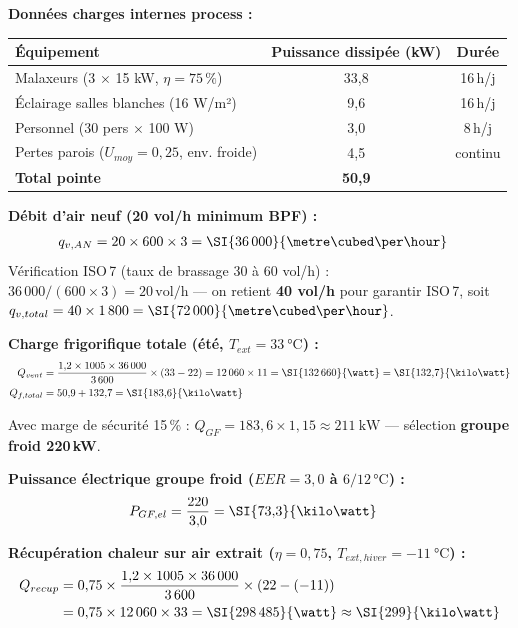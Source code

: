 \begin{exemple}[title={Salle ISO 7 — Pharma à Strasbourg — Bilan complet}]
\textbf{Données charges internes process :}

\begin{center}
\begin{tabular}{lcc}
  \toprule
  Équipement & Puissance dissipée (\si{\kilo\watt}) & Durée \\
  \midrule
  Malaxeurs (3 $\times$ 15 kW, $\eta = 75\,\%$) & 33,8 & 16\,h/j \\
  Éclairage salles blanches (16 W/m²)           &  9,6 & 16\,h/j \\
  Personnel (30 pers $\times$ 100 W)            &  3,0 &  8\,h/j \\
  Pertes parois ($U_{moy} = 0{,}25$, env. froide)&  4,5 & continu \\
  \midrule
  \textbf{Total pointe} & \textbf{50,9} & \\
  \bottomrule
\end{tabular}
\end{center}

\textbf{Débit d'air neuf (20 vol/h minimum BPF) :}
\begin{align*}
  q_{v,AN} &= 20 \times 600 \times 3 = \SI{36\,000}{\metre\cubed\per\hour}
\end{align*}
Vérification ISO\,7 (taux de brassage 30 à 60 vol/h) : $36\,000 / (600 \times 3) = 20\,\mathrm{vol/h}$ —
on retient \textbf{40 vol/h} pour garantir ISO\,7, soit
$q_{v,total} = 40 \times 1\,800 = \SI{72\,000}{\metre\cubed\per\hour}$.

\textbf{Charge frigorifique totale (été, $T_{ext} = \SI{33}{\celsius}$) :}
\begin{align*}
  Q_{vent} &= \frac{1{,}2 \times 1005 \times 36\,000}{3\,600} \times (33 - 22) = 12\,060 \times 11 = \SI{132\,660}{\watt} = \SI{132{,}7}{\kilo\watt} \\
  Q_{f,total} &= 50{,}9 + 132{,}7 = \SI{183{,}6}{\kilo\watt}
\end{align*}

Avec marge de sécurité 15\,\% : $Q_{GF} = 183{,}6 \times 1{,}15 \approx \SI{211}{\kilo\watt}$ — sélection \textbf{groupe froid 220\,kW}.

\textbf{Puissance électrique groupe froid ($EER = 3{,}0$ à $6/12\,\si{\celsius}$) :}
\begin{align*}
  P_{GF,el} &= \frac{220}{3{,}0} = \SI{73{,}3}{\kilo\watt}
\end{align*}

\textbf{Récupération chaleur sur air extrait ($\eta = 0{,}75$, $T_{ext,hiver} = \SI{-11}{\celsius}$) :}
\begin{align*}
  Q_{recup} &= 0{,}75 \times \frac{1{,}2 \times 1005 \times 36\,000}{3\,600} \times (22 - (-11)) \\
             &= 0{,}75 \times 12\,060 \times 33 = \SI{298\,485}{\watt} \approx \SI{299}{\kilo\watt}
\end{align*}


\end{exemple}
